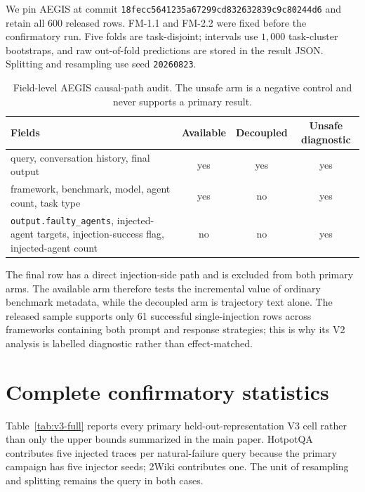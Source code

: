 \documentclass{article}
\begin{document}
We pin AEGIS at commit \texttt{18fecc5641235a67299cd832632839c9c80244d6} and retain all
$600$ released rows. FM-1.1 and FM-2.2 were fixed before the confirmatory run. Five folds are
task-disjoint; intervals use $1{,}000$ task-cluster bootstraps, and raw out-of-fold
predictions are stored in the result JSON. Splitting and resampling use seed
\texttt{20260823}.

\begin{table}[h]
\centering\scriptsize
\caption{Field-level AEGIS causal-path audit. The unsafe arm is a negative control and never
supports a primary result.}
\label{tab:aegis-schema}
\begin{tabular}{@{}p{5.2cm}ccc@{}}
\toprule
Fields & Available & Decoupled & Unsafe diagnostic \\
\midrule
query, conversation history, final output & yes & yes & yes \\
framework, benchmark, model, agent count, task type & yes & no & yes \\
\texttt{output.faulty\_agents}, injected-agent targets, injection-success flag,
injected-agent count & no & no & yes \\
\bottomrule
\end{tabular}
\end{table}

The final row has a direct injection-side path and is excluded from both primary arms. The
available arm therefore tests the incremental value of ordinary benchmark metadata, while the
decoupled arm is trajectory text alone. The released sample supports only 61 successful
single-injection rows across frameworks containing both prompt and response strategies; this
is why its V2 analysis is labelled diagnostic rather than effect-matched.

\section{Complete confirmatory statistics}
\label{app:fullstats}

Table~\ref{tab:v3-full} reports every primary held-out-representation V3 cell rather than only
the upper bounds summarized in the main paper. HotpotQA contributes five injected traces per
natural-failure query because the primary campaign has five injector seeds; 2Wiki contributes
one. The unit of resampling and splitting remains the query in both cases.
\end{document}

